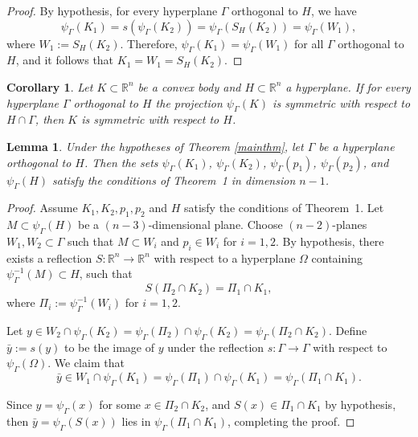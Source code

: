 \documentclass[12pt]{article}
\newtheorem{lemma}{Lemma}
\newtheorem{corollary}{Corollary}
\begin{document}
	\begin{proof}
		By hypothesis, for every hyperplane $\Gamma$ orthogonal to $H$, we have
		\[
		\psi_\Gamma(K_1) = s(\psi_\Gamma(K_2)) = \psi_\Gamma(S_H(K_2)) = \psi_\Gamma(W_1),
		\]
		where $W_1 := S_H(K_2)$. Therefore, $\psi_\Gamma(K_1) = \psi_\Gamma(W_1)$ for all $\Gamma$ orthogonal to $H$, and it follows that $K_1 = W_1 = S_H(K_2)$.
	\end{proof}
	
	\begin{corollary}
		Let $K \subset \mathbb{R}^n$ be a convex body and $H \subset \mathbb{R}^n$ a hyperplane. If for every hyperplane $\Gamma$ orthogonal to $H$ the projection $\psi_\Gamma(K)$ is symmetric with respect to $H \cap \Gamma$, then $K$ is symmetric with respect to $H$.
	\end{corollary}
	
	\begin{lemma}
		Under the hypotheses of Theorem \ref{mainthm}, let $\Gamma$ be a hyperplane orthogonal to $H$. Then the sets $\psi_\Gamma(K_1)$, $\psi_\Gamma(K_2)$, $\psi_\Gamma(p_1)$, $\psi_\Gamma(p_2)$, and $\psi_\Gamma(H)$ satisfy the conditions of Theorem~1 in dimension $n - 1$.
	\end{lemma}
	
	\begin{proof}
		Assume $K_1, K_2, p_1, p_2$ and $H$ satisfy the conditions of Theorem~1. Let $M \subset \psi_\Gamma(H)$ be a $(n-3)$-dimensional plane. Choose $(n-2)$-planes $W_1, W_2 \subset \Gamma$ such that $M \subset W_i$ and $p_i \in W_i$ for $i = 1, 2$. By hypothesis, there exists a reflection $S : \mathbb{R}^n \to \mathbb{R}^n$ with respect to a hyperplane $\Omega$ containing $\psi_\Gamma^{-1}(M) \subset H$, such that
		\[
		S(\Pi_2 \cap K_2) = \Pi_1 \cap K_1,
		\]
		where $\Pi_i := \psi_\Gamma^{-1}(W_i)$ for $i = 1, 2$.
		
		Let $y \in W_2 \cap \psi_\Gamma(K_2) = \psi_\Gamma(\Pi_2) \cap \psi_\Gamma(K_2) = \psi_\Gamma(\Pi_2 \cap K_2)$. Define $\bar{y} := s(y)$ to be the image of $y$ under the reflection $s : \Gamma \to \Gamma$ with respect to $\psi_\Gamma(\Omega)$. We claim that
		\[
		\bar{y} \in W_1 \cap \psi_\Gamma(K_1) = \psi_\Gamma(\Pi_1) \cap \psi_\Gamma(K_1) = \psi_\Gamma(\Pi_1 \cap K_1).
		\]
		
		Since $y = \psi_\Gamma(x)$ for some $x \in \Pi_2 \cap K_2$, and $S(x) \in \Pi_1 \cap K_1$ by hypothesis, then $\bar{y} = \psi_\Gamma(S(x))$ lies in $\psi_\Gamma(\Pi_1 \cap K_1)$, completing the proof.
	\end{proof}
	
\end{document}
